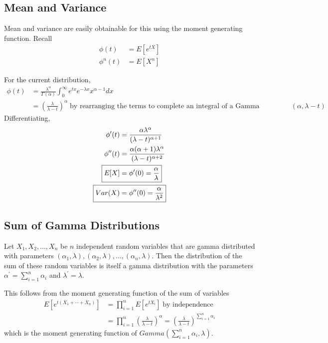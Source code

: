 \documentclass[../probability-notes.tex]{subfiles}
\begin{document}
    \subsection{Mean and Variance}
    Mean and variance are easily obtainable for this using the moment generating function. Recall
    \begin{align*}
        \phi(t) &= E[e^{tX}]\\
        \phi^{n}(t) &= E[X^{n}]
    \end{align*}

    For the current distribution,
    \begin{align*}
        \phi(t) &= \frac{\lambda^{\alpha}}{\Gamma(\alpha)} \int_{0}^{\infty} e^{tx} e^{-\lambda x} x^{\alpha - 1} dx\\
        &= (\frac{\lambda}{\lambda - t})^{\alpha} \; \text{by rearranging the terms to complete an integral of a Gamma distribution with parameters $(\alpha, \lambda - t)$}
    \end{align*}
    Differentiating,
    \begin{align*}
        \phi^{\prime}(t) &= \frac{\alpha \lambda^{\alpha}}{(\lambda - t)^{\alpha + 1}}\\
        \phi^{\prime \prime}(t) &= \frac{\alpha(\alpha + 1)\lambda^{\alpha}}{(\lambda - t)^{\alpha + 2}}\\
        \Aboxed{E[X] &= \phi^{\prime}(0) = \frac{\alpha}{\lambda}}\\
        \Aboxed{Var(X) &= \phi^{\prime \prime}(0) = \frac{\alpha}{\lambda^{2}}}
    \end{align*}

    \subsection{Sum of Gamma Distributions}
    Let $X_{1}, X_{2}, \ldots, X_{n}$ be $n$ independent random variables that are gamma distributed with parameters \newline$(\alpha_{1}, \lambda), (\alpha_{2}, \lambda), \ldots, (\alpha_{n}, \lambda)$. Then the distribution of the sum of these random variables is itself a gamma distribution with the parameters $\alpha^{\prime} = \sum_{i=1}^{n} \alpha_{i}$ and $\lambda^{\prime} = \lambda$.\newline

    This follows from the moment generating function of the sum of variables
    \begin{align*}
        E[e^{t(X_{1} + \cdots + X_{n})}] &= \prod_{i=1}^{n} E[e^{tX_{i}}] \; \text{by independence}\\
        &= \prod_{i=1}^{n} (\frac{\lambda}{\lambda - t})^{\alpha} = (\frac{\lambda}{\lambda - t})^{\sum_{i=1}^{n} \alpha_{i}}
    \end{align*}
    which is the moment generating function of $Gamma(\sum_{i=1}^{n} \alpha_{i}, \lambda)$.
\end{document}
